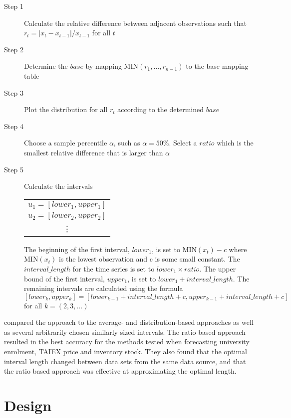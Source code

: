 \documentclass{article}
\theoremstyle{definition}
\begin{document}
\begin{description}
\item[Step 1] Calculate the relative difference between adjacent observations such that $r_t=|x_t-x_{t-1}|/x_{t-1}$ for all $t$
\item[Step 2] Determine the $base$ by mapping MIN$(r_1,\ldots,r_{n-1})$ to the base mapping table
\item[Step 3] Plot the distribution for all $r_t$ according to the determined $base$
\item[Step 4] Choose a sample percentile $\alpha$, such as $\alpha=50\%$. Select a $ratio$ which is the smallest relative difference that is larger than $\alpha$
\item[Step 5] Calculate the intervals 

\begin{table}[H]
	\center
	\begin{tabular}{ c }
	  	$u_1 = [lower_1, upper_1]$ \\
	  	$u_2 = [lower_2, upper_2]$ \\
	  	\vdots \\
	\end{tabular}
\end{table}

The beginning of the first interval, $lower_1$, is set to MIN$(x_t)-c$ where MIN$(x_t)$ is the lowest observation and c is some small constant. The $interval\_length$ for the time series is set to $lower_1 \times ratio$. The upper bound of the first interval, $upper_1$, is set to $lower_1 + interval\_length$. The remaining intervals are calculated using the formula $[lower_k,upper_k]=[lower_{k-1}+interval\_length+c, upper_{k-1}+interval\_length+c]$ for all $k=(2,3,\ldots)$
\end{description}

\cite{huarng2006ratio} compared the approach to the average- and distribution-based approaches as well as several arbitrarily chosen similarly sized intervals. The ratio based approach resulted in the best accuracy for the methods tested when forecasting university enrolment, TAIEX price and inventory stock. They also found that the optimal interval length changed between data sets from the same data source, and that the ratio based approach was effective at approximating the optimal length.

\section{Design}
\end{document}
